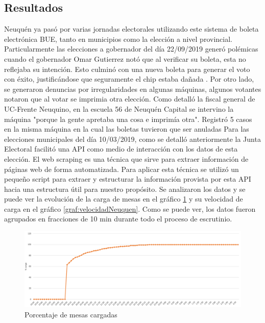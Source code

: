 \subsection{Resultados}
Neuquén ya pasó por varias jornadas electorales utilizando este sistema de boleta electrónica BUE, tanto en municipios como la elección a nivel provincial. Particularmente las elecciones a gobernador del día 22/09/2019 generó polémicas cuando el gobernador Omar Gutierrez notó que al verificar su boleta, esta no reflejaba su intención. Esto culminó con una nueva boleta para generar el voto con éxito, justificándose que seguramente el chip estaba dañada \cite{errorOmarGutierrez}.  Por otro lado, se generaron denuncias por irregularidades en algunas máquinas, algunos votantes notaron que al votar se imprimia otra elección. Como detalló la fiscal general de UC-Frente Neuquino, en la escuela 56 de Neuquén Capital se intervino la máquina "porque la gente apretaba una cosa e imprimía otra". Registró 5 casos en la misma máquina en la cual las boletas tuvieron que ser anuladas \cite{errorNeuquen} \newline
Para las elecciones municipales del día 10/03/2019, como se detalló anteriormente la Junta Electoral facilitó una API como medio de interacción con los datos de esta elección. El web scraping es una técnica que sirve para extraer información de páginas web de forma automatizada. Para aplicar esta técnica se utilizó un pequeño script para extraer y estructurar la información provista por esta API hacia una estructura útil para nuestro propósito. Se analizaron los datos y se puede ver la evolución de la carga de mesas en el gráfico \ref{graf:porcentajeNeuquen} y su velocidad de carga en el gráfico \ref{graf:velocidadNeuquen}. Como se puede ver, los datos fueron agrupados en fracciones de 10 min durante todo el proceso de escrutinio.

\begin{figure}[h!]
  \includegraphics[width=1\textwidth]{fOI0sHj9ac.png}
  \caption{Porcentaje de mesas cargadas}
  \label{graf:porcentajeNeuquen}
\end{figure}

